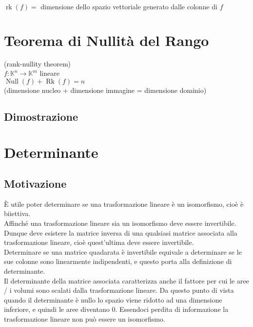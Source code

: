 \documentclass[a4paper, twoside, italian, 11pt]{book}
\DeclareMathOperator{\Null}{Null}
\DeclareMathOperator{\Rk}{Rk}
\DeclareMathOperator{\rk}{rk}
\newcommand{\K}{\mathbb K}
\begin{document}
\noindent
$\rk(f) =$ dimensione dello spazio vettoriale generato dalle colonne di $f$



\section{Teorema di Nullità del Rango}

(rank-nullity theorem) \\

\noindent
$f : \K^n \rightarrow \K^m$ lineare \\

$\Null(f) + \Rk(f) = n$ \\

\noindent
(dimensione nucleo + dimensione immagine = dimensione dominio)


\subsection{Dimostrazione}




\section{Determinante}


\subsection{Motivazione}

È utile poter determinare se una trasformazione lineare è un isomorfismo, cioè è biiettiva. \\

\noindent
Affinché una trasformazione lineare sia un isomorfismo deve essere invertibile. \\

\noindent
Dunque deve esistere la matrice inversa di una qualsiasi matrice associata alla trasformazione lineare, cioè quest'ultima deve essere invertibile. \\

\noindent
Determinare se una matrice quadarata è invertibile equivale a determinare se le sue colonne sono linearmente indipendenti, e questo porta alla definizione di determinante. \\

\noindent
Il determinante della matrice associata caratterizza anche il fattore per cui le aree / i volumi sono scalati dalla trasformazione lineare. Da questo punto di vista quando il determinante è nullo lo spazio viene ridotto ad una dimensione inferiore, e quindi le aree diventano 0. Essendoci perdita di informazione la trasformazione lineare non può essere un isomorfismo.
\end{document}
